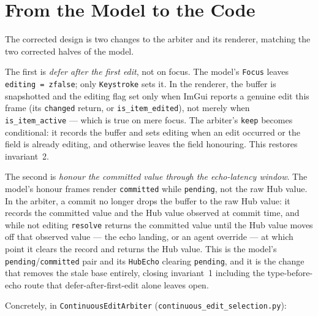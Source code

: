\documentclass[a4paper,10pt,fleqn]{article}
\begin{document}
\section{From the Model to the Code}

The corrected design is two changes to the arbiter and its renderer, matching the
two corrected halves of the model.

The first is \emph{defer after the first edit}, not on focus.  The model's
\texttt{Focus} leaves \texttt{editing = zfalse}; only \texttt{Keystroke} sets it.
In the renderer, the buffer is snapshotted and the editing flag set only when
ImGui reports a genuine edit this frame (its \texttt{changed} return, or
\texttt{is\_item\_edited}), not merely when \texttt{is\_item\_active} --- which is
true on mere focus.  The arbiter's \texttt{keep} becomes conditional: it records
the buffer and sets editing when an edit occurred or the field is already
editing, and otherwise leaves the field honouring.  This restores invariant~2.

The second is \emph{honour the committed value through the echo-latency window}.
The model's honour frames render \texttt{committed} while \texttt{pending}, not
the raw Hub value.  In the arbiter, a commit no longer drops the buffer to the
raw Hub value: it records the committed value and the Hub value observed at
commit time, and while not editing \texttt{resolve} returns the committed value
until the Hub value moves off that observed value --- the echo landing, or an
agent override --- at which point it clears the record and returns the Hub value.
This is the model's \texttt{pending}/\texttt{committed} pair and its
\texttt{HubEcho} clearing \texttt{pending}, and it is the change that removes the
stale base entirely, closing invariant~1 including the type-before-echo route
that defer-after-first-edit alone leaves open.

Concretely, in \texttt{ContinuousEditArbiter}
(\texttt{continuous\_edit\_selection.py}):
\end{document}
